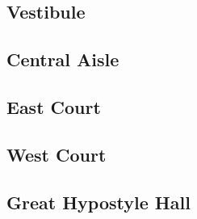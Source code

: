 \documentclass[letterpaper,serif]{module}
\begin{document}
\subsection{Vestibule} %

\begin{boxtext}
\lipsum[1]
\end{boxtext}

\lipsum[2]

\subsection{Central Aisle} %

\begin{boxtext}
\lipsum[3]
\end{boxtext}

\lipsum[4]

\subsection{East Court} %

\lipsum[5]

\subsection{West Court} %

\lipsum[6]

\subsection{Great Hypostyle Hall} %
\label{hypostyle_hall}

\end{document}
